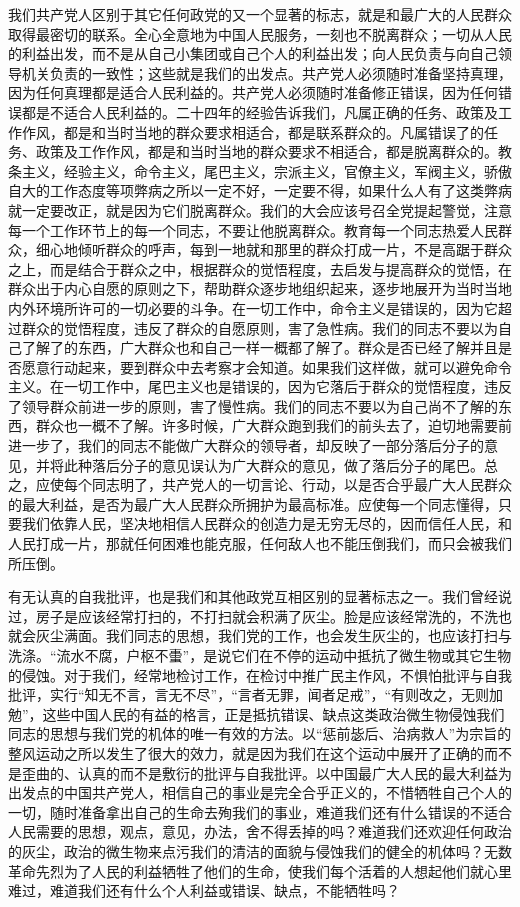 我们共产党人区别于其它任何政党的又一个显著的标志，就是和最广大的人民群众取得最密切的联系。全心全意地为中国人民服务，一刻也不脱离群众；一切从人民的利益出发，而不是从自己小集团或自己个人的利益出发；向人民负责与向自己领导机关负责的一致性；这些就是我们的出发点。共产党人必须随时准备坚持真理，因为任何真理都是适合人民利益的。共产党人必须随时准备修正错误，因为任何错误都是不适合人民利益的。二十四年的经验告诉我们，凡属正确的任务、政策及工作作风，都是和当时当地的群众要求相适合，都是联系群众的。凡属错误了的任务、政策及工作作风，都是和当时当地的群众要求不相适合，都是脱离群众的。教条主义，经验主义，命令主义，尾巴主义，宗派主义，官僚主义，军阀主义，骄傲自大的工作态度等项弊病之所以一定不好，一定要不得，如果什么人有了这类弊病就一定要改正，就是因为它们脱离群众。我们的大会应该号召全党提起警觉，注意每一个工作环节上的每一个同志，不要让他脱离群众。教育每一个同志热爱人民群众，细心地倾听群众的呼声，每到一地就和那里的群众打成一片，不是高踞于群众之上，而是结合于群众之中，根据群众的觉悟程度，去启发与提高群众的觉悟，在群众出于内心自愿的原则之下，帮助群众逐步地组织起来，逐步地展开为当时当地内外环境所许可的一切必要的斗争。在一切工作中，命令主义是错误的，因为它超过群众的觉悟程度，违反了群众的自愿原则，害了急性病。我们的同志不要以为自己了解了的东西，广大群众也和自己一样一概都了解了。群众是否已经了解并且是否愿意行动起来，要到群众中去考察才会知道。如果我们这样做，就可以避免命令主义。在一切工作中，尾巴主义也是错误的，因为它落后于群众的觉悟程度，违反了领导群众前进一步的原则，害了慢性病。我们的同志不要以为自己尚不了解的东西，群众也一概不了解。许多时候，广大群众跑到我们的前头去了，迫切地需要前进一步了，我们的同志不能做广大群众的领导者，却反映了一部分落后分子的意见，并将此种落后分子的意见误认为广大群众的意见，做了落后分子的尾巴。总之，应使每个同志明了，共产党人的一切言论、行动，以是否合乎最广大人民群众的最大利益，是否为最广大人民群众所拥护为最高标准。应使每一个同志懂得，只要我们依靠人民，坚决地相信人民群众的创造力是无穷无尽的，因而信任人民，和人民打成一片，那就任何困难也能克服，任何敌人也不能压倒我们，而只会被我们所压倒。

有无认真的自我批评，也是我们和其他政党互相区别的显著标志之一。我们曾经说过，房子是应该经常打扫的，不打扫就会积满了灰尘。脸是应该经常洗的，不洗也就会灰尘满面。我们同志的思想，我们党的工作，也会发生灰尘的，也应该打扫与洗涤。“流水不腐，户枢不蟗”，是说它们在不停的运动中抵抗了微生物或其它生物的侵蚀。对于我们，经常地检讨工作，在检讨中推广民主作风，不惧怕批评与自我批评，实行“知无不言，言无不尽”，“言者无罪，闻者足戒”，“有则改之，无则加勉”，这些中国人民的有益的格言，正是抵抗错误、缺点这类政治微生物侵蚀我们同志的思想与我们党的机体的唯一有效的方法。以“惩前毖后、治病救人”为宗旨的整风运动之所以发生了很大的效力，就是因为我们在这个运动中展开了正确的而不是歪曲的、认真的而不是敷衍的批评与自我批评。以中国最广大人民的最大利益为出发点的中国共产党人，相信自己的事业是完全合乎正义的，不惜牺牲自己个人的一切，随时准备拿出自己的生命去殉我们的事业，难道我们还有什么错误的不适合人民需要的思想，观点，意见，办法，舍不得丢掉的吗？难道我们还欢迎任何政治的灰尘，政治的微生物来点污我们的清洁的面貌与侵蚀我们的健全的机体吗？无数革命先烈为了人民的利益牺牲了他们的生命，使我们每个活着的人想起他们就心里难过，难道我们还有什么个人利益或错误、缺点，不能牺牲吗？


